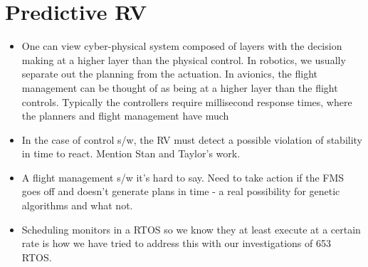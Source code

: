 \section{Predictive RV} \label{sec:predictive}

\noindent{}

\begin{itemize}
\item One can view cyber-physical system composed of layers with the
decision making at a higher layer than the physical control. In
robotics, we usually separate out the planning from the actuation. In
avionics, the flight management can be thought of as being at a higher
layer than the flight controls. Typically the controllers require
millisecond response times, where the planners and flight management
have much   
\item In the case of control s/w, the RV must detect a possible
violation of stability in time to react. Mention Stan and Taylor's
work.
\item A flight management s/w it's hard to say. Need to take action if the
FMS goes off and doesn't generate plans in time - a real possibility
for genetic algorithms and what not. 
\item Scheduling monitors in a RTOS so we know they at least execute
at a certain rate is how we have tried to address this with our
investigations of 653 RTOS.
\end{itemize}